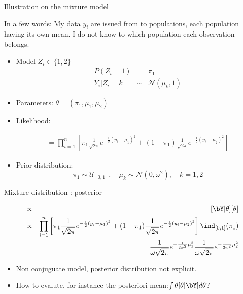 \begin{frame}{Illustration on the mixture model}

{\footnotesize \vert In a few words\noir:  My data $y_i$ are issued from to populations, each population having its own mean. I do not know to which population each observation belongs. 
}

\begin{itemize}
 \item \vert Model \noir $Z_i \in \{1,2\}$
 \begin{eqnarray*}
 P(Z_i = 1) &=& \pi_1\\
 Y_i  | Z_i = k  &\sim&  \mathcal{N}(\mu_k,1)
 \end{eqnarray*}
\item \vert Parameters: \noir $\theta = (\pi_1,\mu_1,\mu_2)$
\item \vert Likelihood: \noir
 
\begin{eqnarray*}
[\bY | \theta] = \prod_{i=1}^n \left[\pi_1 \frac{1}{\sqrt{2\pi}}e^{-\frac{1}{2}(y_i-\mu_1)^2} + (1-\pi_1)\frac{1}{\sqrt{2\pi}}e^{-\frac{1}{2}(y_i-\mu_2)^2} \right]
\end{eqnarray*}

 
\item \vert Prior distribution: \noir
 $$\pi_1 \sim \mathcal{U}_{[0,1]}, \quad \mu_k \sim \mathcal{N}(0,\omega^2), \quad k=1,2$$
 \end{itemize}
\end{frame}

 
\begin{frame}{Mixture distribution : posterior}

\begin{eqnarray*}
[\theta | \bY] &\propto&   [\bY | \theta] [\theta]\\
&\propto & \prod_{i=1}^n \left[\pi_1 \frac{1}{\sqrt{2\pi}}e^{-\frac{1}{2}(y_i-\mu_1)^2} + (1-\pi_1)\frac{1}{\sqrt{2\pi}}e^{-\frac{1}{2}(y_i-\mu_2)^2} \right]   \ind_{[0,1]}(\pi_1)  \\
&&  \frac{1}{\omega \sqrt{2\pi}}e^{-\frac{1}{2 \omega^2} \mu_1 ^2} \frac{1}{\omega \sqrt{2\pi}}e^{-\frac{1}{2 \omega^2} \mu_2 ^2}
\end{eqnarray*}


\begin{itemize}
\item  Non conjuguate model, posterior distribution not explicit.
\item  How to evalute, for instance the \vert posteriori mean:\noir $\int \theta [\theta | \bY] d\theta$?  
\end{itemize}
\end{frame}

